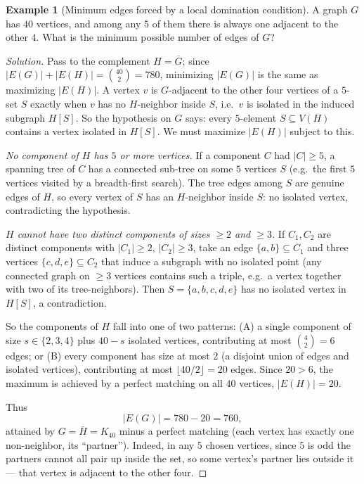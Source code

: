 \documentclass[11pt]{article}
\theoremstyle{definition}
\newtheorem{example}{Example}[section]
\begin{document}
\begin{example}[Minimum edges forced by a local domination condition]
A graph $G$ has $40$ vertices, and among any $5$ of them there is always one adjacent to the other $4$. What is the minimum possible number of edges of $G$?
\end{example}

\begin{proof}[Solution]
Pass to the complement $H=\overline{G}$; since $|E(G)|+|E(H)|=\binom{40}{2}=780$, minimizing $|E(G)|$ is the same as maximizing $|E(H)|$. A vertex $v$ is $G$-adjacent to the other four vertices of a $5$-set $S$ exactly when $v$ has no $H$-neighbor inside $S$, i.e.\ $v$ is isolated in the induced subgraph $H[S]$. So the hypothesis on $G$ says: every $5$-element $S\subseteq V(H)$ contains a vertex isolated in $H[S]$. We must maximize $|E(H)|$ subject to this.

\emph{No component of $H$ has $5$ or more vertices.} If a component $C$ had $|C|\ge5$, a spanning tree of $C$ has a connected sub-tree on some $5$ vertices $S$ (e.g.\ the first $5$ vertices visited by a breadth-first search). The tree edges among $S$ are genuine edges of $H$, so every vertex of $S$ has an $H$-neighbor inside $S$: no isolated vertex, contradicting the hypothesis.

\emph{$H$ cannot have two distinct components of sizes $\ge2$ and $\ge3$.} If $C_1,C_2$ are distinct components with $|C_1|\ge2$, $|C_2|\ge3$, take an edge $\{a,b\}\subseteq C_1$ and three vertices $\{c,d,e\}\subseteq C_2$ that induce a subgraph with no isolated point (any connected graph on $\ge3$ vertices contains such a triple, e.g.\ a vertex together with two of its tree-neighbors). Then $S=\{a,b,c,d,e\}$ has no isolated vertex in $H[S]$, a contradiction.

So the components of $H$ fall into one of two patterns: (A) a single component of size $s\in\{2,3,4\}$ plus $40-s$ isolated vertices, contributing at most $\binom42=6$ edges; or (B) every component has size at most $2$ (a disjoint union of edges and isolated vertices), contributing at most $\lfloor 40/2\rfloor=20$ edges. Since $20>6$, the maximum is achieved by a perfect matching on all $40$ vertices, $|E(H)|=20$.

Thus
\[
|E(G)|=780-20=\boxed{760},
\]
attained by $G=\overline{H}=K_{40}$ minus a perfect matching (each vertex has exactly one non-neighbor, its ``partner''). Indeed, in any $5$ chosen vertices, since $5$ is odd the partners cannot all pair up inside the set, so some vertex's partner lies outside it — that vertex is adjacent to the other four.
\end{proof}
\end{document}
